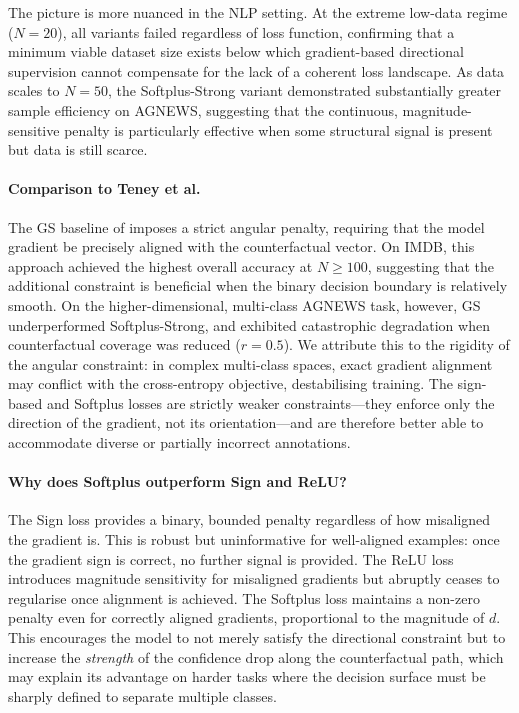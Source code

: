 The picture is more nuanced in the NLP setting. At the extreme low-data regime ($N=20$), all variants failed regardless of loss function, confirming that a minimum viable dataset size exists below which gradient-based directional supervision cannot compensate for the lack of a coherent loss landscape. As data scales to $N=50$, the Softplus-Strong variant demonstrated substantially greater sample efficiency on AGNEWS, suggesting that the continuous, magnitude-sensitive penalty is particularly effective when some structural signal is present but data is still scarce.

\paragraph{Comparison to Teney et al.}
The GS baseline of \citet{teney2020learning} imposes a strict angular penalty, requiring that the model gradient be precisely aligned with the counterfactual vector. On IMDB, this approach achieved the highest overall accuracy at $N \geq 100$, suggesting that the additional constraint is beneficial when the binary decision boundary is relatively smooth. On the higher-dimensional, multi-class AGNEWS task, however, GS underperformed Softplus-Strong, and exhibited catastrophic degradation when counterfactual coverage was reduced ($r=0.5$). We attribute this to the rigidity of the angular constraint: in complex multi-class spaces, exact gradient alignment may conflict with the cross-entropy objective, destabilising training. The sign-based and Softplus losses are strictly weaker constraints---they enforce only the direction of the gradient, not its orientation---and are therefore better able to accommodate diverse or partially incorrect annotations.

\paragraph{Why does Softplus outperform Sign and ReLU?}
The Sign loss provides a binary, bounded penalty regardless of how misaligned the gradient is. This is robust but uninformative for well-aligned examples: once the gradient sign is correct, no further signal is provided. The ReLU loss introduces magnitude sensitivity for misaligned gradients but abruptly ceases to regularise once alignment is achieved. The Softplus loss maintains a non-zero penalty even for correctly aligned gradients, proportional to the magnitude of $d$. This encourages the model to not merely satisfy the directional constraint but to increase the \emph{strength} of the confidence drop along the counterfactual path, which may explain its advantage on harder tasks where the decision surface must be sharply defined to separate multiple classes.

